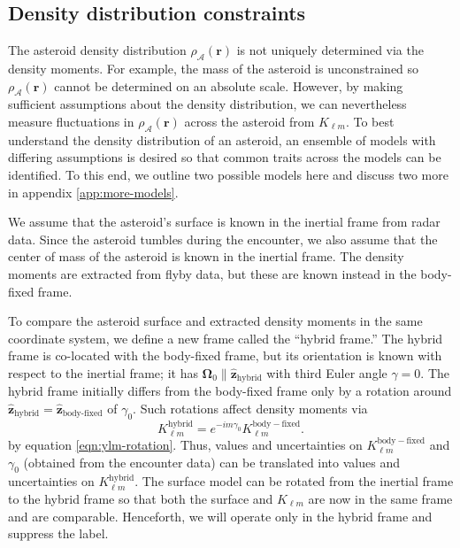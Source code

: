 \documentclass[fleqn,usenatbib]{mnras}
\newcommand{\unit}[1]{\bm{\hat{#1}}}
\begin{document}
\subsection{Density distribution constraints}
\label{sec:density-distro}

The asteroid density distribution $\rho_\mathcal{A}(\bm r)$ is not uniquely determined via the density moments. For example, the mass of the asteroid is unconstrained so $\rho_\mathcal{A}(\bm r)$ cannot be determined on an absolute scale. However, by making sufficient assumptions about the density distribution, we can nevertheless measure fluctuations in $\rho_\mathcal{A}(\bm r)$ across the asteroid from $K_{\ell m}$. To best understand the density distribution of an asteroid, an ensemble of models with differing assumptions is desired so that common traits across the models can be identified. To this end, we outline two possible models here and discuss two more in appendix \ref{app:more-models}.

We assume that the asteroid's surface is known in the inertial frame from radar data. Since the asteroid tumbles during the encounter, we also assume that the center of mass of the asteroid is known in the inertial frame. The density moments are extracted from flyby data, but these are known instead in the body-fixed frame.

To compare the asteroid surface and extracted density moments in the same coordinate system, we define a new frame called the ``hybrid frame.'' The hybrid frame is co-located with the body-fixed frame, but its orientation is known with respect to the inertial frame; it has $\bm \Omega_0 \parallel \unit z_\text{hybrid}$ with third Euler angle $\gamma = 0$. The hybrid frame initially differs from the body-fixed frame only by a rotation around $\unit z_\text{hybrid}=\unit z_\text{body-fixed}$ of $\gamma_0$. Such rotations affect density moments via 
\begin{equation}
  K_{\ell m}^\mathrm{hybrid} = e^{-im\gamma_0}K_{\ell m}^\mathrm{body-fixed}.
  \label{eqn:body-fixed-to-hybrid}
\end{equation}
by equation \ref{eqn:ylm-rotation}. Thus, values and  uncertainties on $K_{\ell m}^\mathrm{body-fixed}$ and $\gamma_0$ (obtained from the encounter data) can be translated into values and uncertainties on $K_{\ell m}^\mathrm{hybrid}$. The surface model can be rotated from the inertial frame to the hybrid frame so that both the surface and $K_{\ell m}$ are now in the same frame and are comparable. Henceforth, we will operate only in the hybrid frame and suppress the label.
\end{document}

